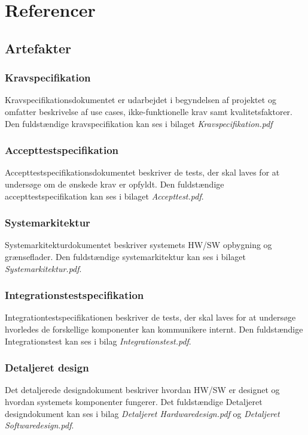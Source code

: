\chapter{Referencer}
\section{Artefakter}
\subsection{Kravspecifikation}
Kravspecifikationsdokumentet er udarbejdet i begyndelsen af projektet og omfatter beskrivelse af use cases, ikke-funktionelle krav samt kvalitetsfaktorer. Den fuldstændige kravspecifikation kan ses i bilaget \textit{Kravspecifikation.pdf}

\subsection{Accepttestspecifikation}
Accepttestspecifikationsdokumentet beskriver de tests, der skal laves for at undersøge om de ønskede krav er opfyldt. Den fuldstændige accepttestspecifikation kan ses i bilaget \textit{Accepttest.pdf}.

\subsection{Systemarkitektur}
Systemarkitekturdokumentet beskriver systemets HW/SW opbygning og grænseflader. Den fuldstændige systemarkitektur kan ses i bilaget \textit{Systemarkitektur.pdf}.

\subsection{Integrationstestspecifikation}
Integrationtestspecifikationen beskriver de tests, der skal laves for at undersøge hvorledes de forskellige komponenter kan kommunikere internt. Den fuldstændige Integrationstest kan ses i bilag \textit{Integrationstest.pdf}.

\subsection{Detaljeret design}
\label{ch:DetajlDesign}
Det detaljerede designdokument beskriver hvordan HW/SW er designet og hvordan systemets komponenter fungerer. Det fuldstændige Detaljeret designdokument kan ses i bilag \textit{Detaljeret Hardwaredesign.pdf} og \textit{Detaljeret Softwaredesign.pdf}.

